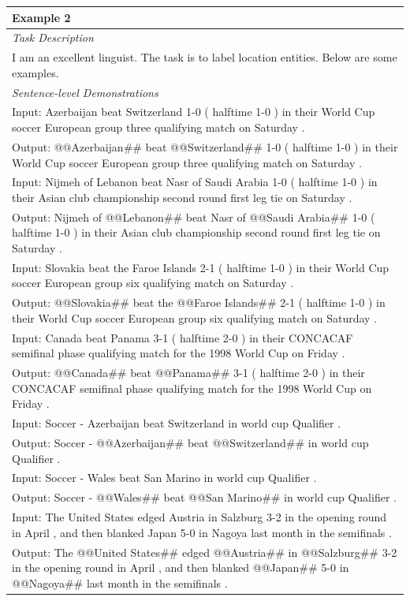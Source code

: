 \documentclass[11pt]{article}
\begin{document}
\begin{table}[th!]
{\begin{tabular}{l}
\textbf{Example 2} \\\midrule
       	\textit{Task Description} \\
I am an excellent linguist. The task is to label location entities. Below are some examples. \\\midrule
\textit{Sentence-level Demonstrations} \\
Input: Azerbaijan beat Switzerland 1-0 ( halftime 1-0 ) in their World Cup soccer European group three qualifying match on Saturday . \\
Output: @@Azerbaijan\#\# beat @@Switzerland\#\# 1-0 ( halftime 1-0 ) in their World Cup soccer European group three qualifying match on Saturday . \\
Input: Nijmeh of Lebanon beat Nasr of Saudi Arabia 1-0 ( halftime 1-0 ) in their Asian club championship second round first leg tie on Saturday . \\
Output: Nijmeh of @@Lebanon\#\# beat Nasr of @@Saudi Arabia\#\# 1-0 ( halftime 1-0 ) in their Asian club championship second round first leg tie on Saturday . \\
Input: Slovakia beat the Faroe Islands 2-1 ( halftime 1-0 ) in their World Cup soccer European group six qualifying match on Saturday . \\
Output: @@Slovakia\#\# beat the @@Faroe Islands\#\# 2-1 ( halftime 1-0 ) in their World Cup soccer European group six qualifying match on Saturday . \\
Input: Canada beat Panama 3-1 ( halftime 2-0 ) in their CONCACAF semifinal phase qualifying match for the 1998 World Cup on Friday . \\
Output: @@Canada\#\# beat @@Panama\#\# 3-1 ( halftime 2-0 ) in their CONCACAF semifinal phase qualifying match for the 1998 World Cup on Friday . \\
Input: Soccer - Azerbaijan beat Switzerland in world cup Qualifier . \\
Output: Soccer - @@Azerbaijan\#\# beat @@Switzerland\#\# in world cup Qualifier . \\
Input: Soccer - Wales beat San Marino in world cup Qualifier . \\
Output: Soccer - @@Wales\#\# beat @@San Marino\#\# in world cup Qualifier . \\
Input: The United States edged Austria in Salzburg 3-2 in the opening round in April , and then blanked Japan 5-0 in Nagoya last month in the semifinals . \\
Output: The @@United States\#\# edged @@Austria\#\# in @@Salzburg\#\# 3-2 in the opening round in April , and then blanked @@Japan\#\# 5-0 in @@Nagoya\#\# last month in the semifinals . \\

\end{tabular}}
\end{table}
\end{document}
